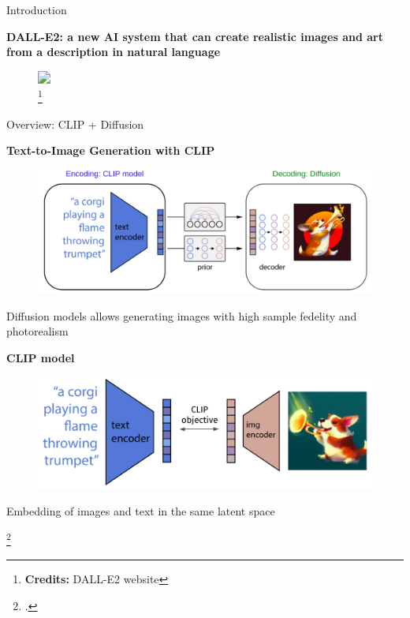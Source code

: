 \documentclass[aspectratio=169, 9pt]{beamer}
\theoremstyle{definition}
\begin{document}
\begin{frame}{Introduction}
  \begin{center}
    \bf\bf DALL-E2: a new AI system that can create realistic images and art from a 
    description in natural language
  \end{center}
  \begin{figure}[h]
    \centering
    \includegraphics<1>[clip, width=0.85\textwidth, trim=0 0 0 0]{./pic/dalle-samples2.png}%
    \caption{\footnote{\textbf{Credits:} DALL-E2 website}}
  \end{figure}
\end{frame}
\begin{frame}{Overview: CLIP + Diffusion}
  \begin{minipage}[t]{0.47\textwidth}
    \begin{center}
      \bf Text-to-Image Generation with CLIP
    \end{center}
    \begin{figure}[h]
      \centering
      \includegraphics[width=1\textwidth]{./pic/dalle-encdec.png}
    \end{figure}
    \begin{center}
      Diffusion models allows generating images with  high sample fedelity
      and photorealism
    \end{center}
  \end{minipage}\hfill%
  \begin{minipage}[t]{0.47\textwidth}
    \begin{center}
      \bf CLIP model
    \end{center}
    \begin{figure}[h]
      \vspace{0.25cm}
      \centering
      \includegraphics[width=\textwidth]{./pic/dalle-clip-intro.png}
    \end{figure}
  \begin{center}
    Embedding of images and text in the same latent space
  \end{center}
  \end{minipage}\hfill%
  \footcite{dalle2}
\end{frame}
\end{document}
